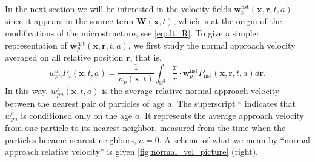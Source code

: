 In the next section we will be interested in the velocity fields $\textbf{w}_p^\text{nst}(\textbf{x},\textbf{r},t,a)$ since it appears in the source term $\textbf{W}(\textbf{x},t)$, which is at the origin of the modifications of the microstructure, see \ref{eq:dt_R}. 
To give a simpler representation of $\textbf{w}_p^\text{nst}(\textbf{x},\textbf{r},t,a)$, we first study the normal approach velocity averaged on all relative position $\textbf{r}$, that is,  
\begin{equation*}
    w_{pn}^aP_a(\textbf{x},t,a)
    = \frac{1}{n_p(\textbf{x},t)}
    \int_{\mathbb{R}^3}
    \frac{\textbf{r}}{r} \cdot \textbf{w}^\text{nst}_p
    P_\text{nst}(\textbf{x},\textbf{r},t,a) d\textbf{r}.
\end{equation*}
In this way, $w^\text{a}_{pn}(\textbf{x},t,a)$ is the average relative normal approach velocity between the nearest pair of particles of age $a$. 
The superscript $^a$ indicates that $w_{pn}^a$ is conditioned only on the age $a$. 
It represents the average approach velocity from one particle to its nearest neighbor, measured from the time when the particles became nearest neighbors, $a=0$.
A scheme of what we mean by ``normal approach relative velocity'' is given \ref{fig:normal_vel_picture} (right). 
